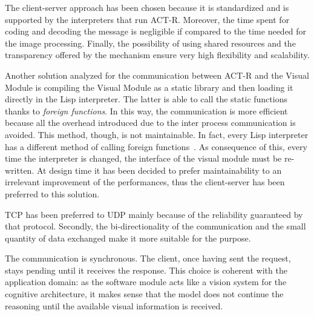 	The client-server approach has been chosen because it is standardized and is supported by the interpreters that run \mbox{ACT-R}. 
	Moreover, the time spent for coding and decoding the message is negligible if compared to the time needed for the image processing.
	Finally, the possibility of using shared resources and the transparency offered by the mechanism ensure very high flexibility and scalability.
	

	Another solution analyzed for the communication between \mbox{ACT-R} and the Visual Module is compiling the Visual Module as a static library and then loading it directly in the \mbox{Lisp} interpreter.
	The latter is able to call the static functions thanks to \emph{foreign functions}.
	In this way, the communication is more efficient because all the overhead introduced due to the inter process communication is avoided. 
	This method, though, is not maintainable. 
	In fact, every \mbox{Lisp} interpreter has a different method of calling foreign functions~\cite{SWIGDoc}. 
	As consequence of this, every time the interpreter is changed, the interface of the visual module must be re-written.
 	At design time it has been decided to prefer maintainability to an irrelevant improvement of the performances, thus the client-server has been preferred to this solution.

	TCP has been preferred to \mbox{UDP} mainly because of the reliability guaranteed by that protocol. 
	Secondly, the bi-directionality of the communication and the small quantity of data exchanged make it more suitable for the purpose.

	The communication is synchronous. 
	The client, once having sent the request, stays pending until it receives the response. 
	This choice is coherent with the application domain: as the software module acts like a vision system for the cognitive architecture, it makes sense that the model does not continue the reasoning until the available visual information is received.

